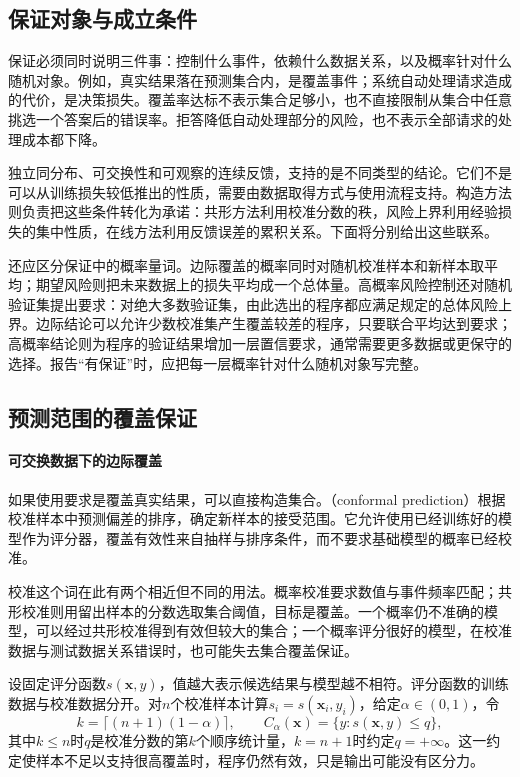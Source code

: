 \subsection{保证对象与成立条件}

保证必须同时说明三件事：控制什么事件，依赖什么数据关系，以及概率针对什么随机对象。例如，真实结果落在预测集合内，是覆盖事件；系统自动处理请求造成的代价，是决策损失。覆盖率达标不表示集合足够小，也不直接限制从集合中任意挑选一个答案后的错误率。拒答降低自动处理部分的风险，也不表示全部请求的处理成本都下降。

独立同分布、可交换性和可观察的连续反馈，支持的是不同类型的结论。它们不是可以从训练损失较低推出的性质，需要由数据取得方式与使用流程支持。构造方法则负责把这些条件转化为承诺：共形方法利用校准分数的秩，风险上界利用经验损失的集中性质，在线方法利用反馈误差的累积关系。下面将分别给出这些联系。

还应区分保证中的概率量词。边际覆盖的概率同时对随机校准样本和新样本取平均；期望风险则把未来数据上的损失平均成一个总体量。高概率风险控制还对随机验证集提出要求：对绝大多数验证集，由此选出的程序都应满足规定的总体风险上界。边际结论可以允许少数校准集产生覆盖较差的程序，只要联合平均达到要求；高概率结论则为程序的验证结果增加一层置信要求，通常需要更多数据或更保守的选择。报告“有保证”时，应把每一层概率针对什么随机对象写完整。

\subsection{预测范围的覆盖保证}

\paragraph{可交换数据下的边际覆盖}

如果使用要求是覆盖真实结果，可以直接构造集合。（conformal prediction）根据校准样本中预测偏差的排序，确定新样本的接受范围。它允许使用已经训练好的模型作为评分器，覆盖有效性来自抽样与排序条件，而不要求基础模型的概率已经校准。

校准这个词在此有两个相近但不同的用法。概率校准要求数值与事件频率匹配；共形校准则用留出样本的分数选取集合阈值，目标是覆盖。一个概率仍不准确的模型，可以经过共形校准得到有效但较大的集合；一个概率评分很好的模型，在校准数据与测试数据关系错误时，也可能失去集合覆盖保证。

设固定评分函数$s(\bm{x},y)$，值越大表示候选结果与模型越不相符。评分函数的训练数据与校准数据分开。对$n$个校准样本计算$s_i=s(\bm{x}_i,y_i)$，给定$\alpha\in(0,1)$，令
\begin{equation}
 k=\lceil(n+1)(1-\alpha)\rceil,\qquad
 C_\alpha(\bm{x})=\{y:s(\bm{x},y)\leq q\},
 \label{eq:reliability-conformal-set}
\end{equation}
其中$k\leq n$时$q$是校准分数的第$k$个顺序统计量，$k=n+1$时约定$q=+\infty$。这一约定使样本不足以支持很高覆盖时，程序仍然有效，只是输出可能没有区分力。

